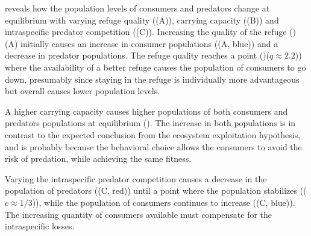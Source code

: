  reveals how the population levels of consumers and predators change at equilibrium with varying refuge quality ((A)), carrying capacity ((B)) and intraspecific predator competition ((C)).
Increasing the quality of the refuge ()(A) initially causes an increase in consumer populations ((A, blue)) and a decrease in predator populations. The refuge quality reaches a point ()($q \approx 2.2$)) where the availability of a better refuge causes the population of consumers to go down, presumably since staying in the refuge is individually more advantageous but overall causes lower population levels.

A higher carrying capacity causes higher populations of both consumers and predators populations at equilibrium (). The increase in both populations is in contrast to the expected conclusion from the ecosystem exploitation hypothesis, and is probably because the behavioral choice allows the consumers to avoid the risk of predation, while achieving the same fitness.

Varying the intraspecific predator competition causes a decrease in the population of predators ((C, red)) until a point where the population stabilizes (($c\approx 1/3$)), while the population of consumers continues to increase ((C, blue)). The increasing quantity of consumers available must compensate for the intraspecific losses.

